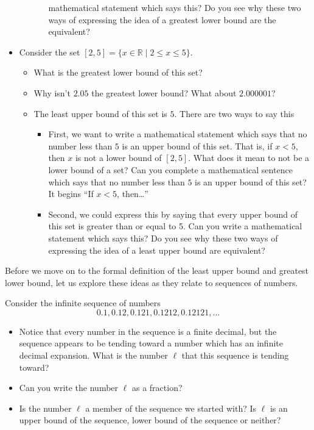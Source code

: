 \documentclass[11pt]{article}
\newenvironment{task}
	{\begin{mdframed}[linecolor=lightgray, linewidth=3pt]\raggedright}
	{\end{mdframed}}
\theoremstyle{definition}
\begin{document}
\begin{task}
\begin{itemize}
\begin{itemize}
\begin{itemize}
          mathematical statement which says this? Do you see why these two ways of expressing the idea of a greatest lower bound are
          the equivalent?
        \end{itemize}
    \end{itemize}
    \item Consider the set $[2,5]=\{ x\in\mathbb{R} \mid 2 \leq x \leq 5 \}$. 
      \begin{itemize}
        \item What is the greatest lower bound of this set? 
        \item Why isn't $2.05$ the greatest lower bound? What about $2.000001$?
        \item The least upper bound of this set is $5$. There are two ways to say this
          \begin{itemize}
            \item First, we want to write a mathematical statement which says that no number less than
          $5$ is an upper bound of this set.  That is, if $x < 5$, then $x$ is not a lower bound of $[2,5]$. What does it mean to not be
          a lower bound of a set? Can you complete a mathematical sentence which says that no number less than $5$ is an upper bound of
          this set? It begins ``If $x < 5$, then\dots''
          \item Second, we could express this by saying that every upper bound of this set is greater than or equal to 5. Can you
            write a mathematical statement which says this? Do you see why these two ways of expressing the idea of a least upper bound
            are equivalent?
          \end{itemize}
      \end{itemize}
  \end{itemize}
\end{task}

Before we move on to the formal definition of the least upper bound and greatest lower bound, let us explore these ideas as they relate to sequences of numbers.

\begin{task}
  Consider the infinite sequence of numbers
  \[ 0.1, 0.12, 0.121, 0.1212, 0.12121, \dots \]
  \begin{itemize}
    \item Notice that every number in the sequence is a finite decimal, but the sequence appears to be tending toward a number which has an infinite decimal expansion. What is the number $\ell$ that this 
      sequence is tending toward?
    \item Can you write the number $\ell$ as a fraction?
    \item Is the number $\ell$ a member of the sequence we started with? Is $\ell$ is an upper bound of the sequence, lower bound of the sequence or neither?
  \end{itemize}
  
\end{task}
\end{document}
